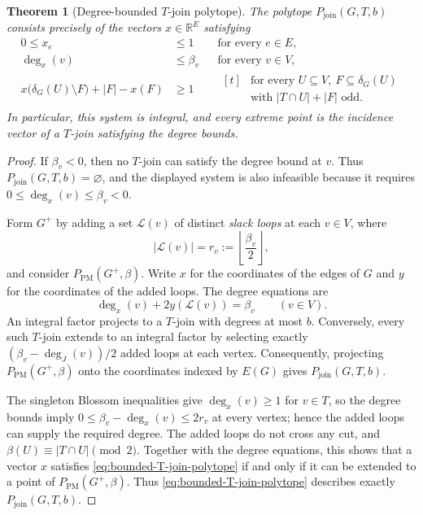 \documentclass[11pt]{amsart}
\newcommand{\1}{\mathbbm{1}}
\newtheorem{theorem}{Theorem}[section]
\begin{document}
\begin{theorem}[Degree-bounded $T$-join polytope]
\label{thm:bounded-T-join}
The polytope $P_{\mathrm{join}}(G,T,b)$ consists precisely of the
vectors $x\in\mathbb{R}^{E}$ satisfying
\begin{equation}
\label{eq:bounded-T-join-polytope}
    \begin{aligned}
        0\le x_e &\le 1
        &&\text{for every }e\in E,\\[3pt]
        \deg_x(v) &\le \beta_v
        &&\text{for every }v\in V,\\[3pt]
        x\bigl(\delta_G(U)\setminus F\bigr)+|F|-x(F) &\ge 1
        &&\begin{aligned}[t]
            &\text{for every }U\subseteq V,\ F\subseteq\delta_G(U)\\
            &\text{with }|T\cap U|+|F|\text{ odd}.
        \end{aligned}
    \end{aligned}
\end{equation}
In particular, this system is integral, and every extreme point
is the incidence vector of a $T$-join satisfying the degree bounds.
\end{theorem}

\begin{proof}
If $\beta_v<0$, then no $T$-join
can satisfy the degree bound at $v$. Thus $P_{\mathrm{join}}(G,T,b)=\varnothing$, and the displayed
system is also infeasible because it requires
$0\le\deg_x(v)\le\beta_v<0$.

Form $G^+$ by adding a set $\mathcal L(v)$ of distinct
\emph{slack loops} at each $v\in V$, where
\[
    |\mathcal L(v)|=r_v:=\left\lfloor\frac{\beta_v}{2}\right\rfloor,
\]
and consider $P_{\mathrm{PM}}(G^+,\beta)$.
Write $x$ for the coordinates of the edges of $G$ and $y$ for
the coordinates of the added loops. The degree equations are
\begin{equation}
\label{eq:T-join-lift-degrees}
    \deg_x(v)+2y(\mathcal L(v))=\beta_v
    \qquad(v\in V).
\end{equation}
An integral factor projects to a $T$-join with degrees at most $b$.
Conversely, every such $T$-join extends to an integral factor by
selecting exactly $(\beta_v-\deg_J(v))/2$ added loops at each vertex.
Consequently, projecting $P_{\mathrm{PM}}(G^+,\beta)$ onto the
coordinates indexed by $E(G)$ gives $P_{\mathrm{join}}(G,T,b)$.

The singleton Blossom inequalities give $\deg_x(v)\ge1$ for
$v\in T$, so the degree bounds imply
$0\le\beta_v-\deg_x(v)\le2r_v$ at every vertex; hence the
added loops can supply the required degree. The added loops do not cross any cut, and
$\beta(U)\equiv|T\cap U|\pmod2$. Together with the degree
equations, this shows that a vector $x$ satisfies
\eqref{eq:bounded-T-join-polytope} if and only if it can be
extended to a point of $P_{\mathrm{PM}}(G^+,\beta)$.
Thus \eqref{eq:bounded-T-join-polytope} describes exactly
$P_{\mathrm{join}}(G,T,b)$.
\end{proof}
\end{document}
